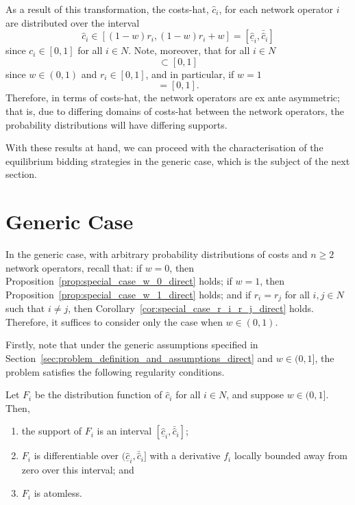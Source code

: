 As a result of this transformation, the costs-hat, $\hat{c}_i$, for each network operator $i$ are distributed over the interval
\begin{equation*}
  \hat{c}_i\in [(1-w)r_i, (1-w)r_i + w]= [\underline{\hat{c}}_i, \bar{\hat{c}}_i]
\end{equation*}
since $c_i\in [0,1]$ for all $i\in N$. Note, moreover, that for all $i\in N$
\begin{equation*}
  [\underline{\hat{c}}_i, \bar{\hat{c}}_i] \subset [0,1]
\end{equation*}
since $w\in (0,1)$ and $r_i\in [0,1]$, and in particular, if $w=1$
\begin{equation*}
  [\underline{\hat{c}}_i, \bar{\hat{c}}_i] = [0,1].
\end{equation*}
Therefore, in terms of costs-hat, the network operators are ex ante asymmetric; that is, due to differing domains of costs-hat between the network operators, the probability distributions will have differing supports.

With these results at hand, we can proceed with the characterisation of the equilibrium bidding strategies in the generic case, which is the subject of the next section.

\section{Generic Case} %
\label{sec:generic_case_indirect}
In the generic case, with arbitrary probability distributions of costs and $n\ge 2$ network operators, recall that: if $w=0$, then Proposition~\ref{prop:special_case_w_0_direct} holds; if $w=1$, then Proposition~\ref{prop:special_case_w_1_direct} holds; and if $r_i=r_j$ for all $i,j\in N$ such that $i\neq j$, then Corollary~\ref{cor:special_case_r_i_r_j_direct} holds. Therefore, it suffices to consider only the case when $w\in (0,1)$.

Firstly, note that under the generic assumptions specified in Section~\ref{sec:problem_definition_and_assumptions_direct} and $w\in (0,1]$, the problem satisfies the following regularity conditions.
\begin{proposition}
\label{prop:regularity_conditions_indirect}
Let $F_i$ be the distribution function of $\hat{c}_i$ for all $i\in N$, and suppose $w\in (0,1]$. Then,
\begin{enumerate}
  \item the support of $F_i$ is an interval ${[\underline{\hat{c}}_i, \bar{\hat{c}}_i]}$;
  \item $F_i$ is differentiable over ${(\underline{\hat{c}}_i, \bar{\hat{c}}_i]}$ with a derivative $f_i$ locally bounded away from zero over this interval; and
  \item $F_i$ is atomless.
\end{enumerate}
\end{proposition}

